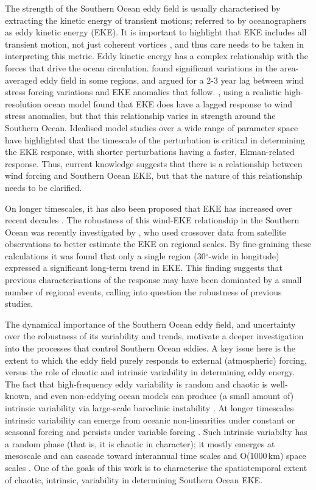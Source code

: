 \documentclass[linenumbers]{agujournal2019}
\begin{document}
The strength of the Southern Ocean eddy field is usually characterised by extracting the kinetic energy of transient motions; referred to by oceanographers as eddy kinetic energy (EKE). 
It is important to highlight that EKE includes all transient motion, not just coherent vortices \citep{Martinez-Moreno2019}, and thus care needs to be taken in interpreting this metric.
Eddy kinetic energy has a complex relationship with the forces that drive the ocean circulation.
\citet{Meredith-Hogg-2006} found significant variations in the area-averaged eddy field in some regions, and argued for a 2-3 year lag between wind stress forcing variations and EKE anomalies that follow.
\citet{Patara2016}, using a realistic high-resolution ocean model found that EKE does have a lagged response to wind stress anomalies, but that this relationship varies in strength around the Southern Ocean.
Idealised model studies over a wide range of parameter space \citep{Sinha2016} have highlighted that the timescale of the perturbation is critical in determining the EKE response, with shorter perturbations having a faster, Ekman-related response.
Thus, current knowledge suggests that there is a relationship between wind forcing and Southern Ocean EKE, but that the nature of this relationship needs to be clarified.

On longer timescales, it has also been proposed that EKE has increased over recent decades \citep{Hogg2015, Martinez-Moreno2019, Martinez-Moreno2021-ncc}.
The robustness of this wind-EKE relationship in the Southern Ocean was recently investigated by \citet{Zhang2021}, who used crossover data from satellite observations \citep[as in][]{Hogg2015} to better estimate the EKE on regional scales.
By fine-graining these calculations it was found that only a single region (30$^\circ$-wide in longitude) expressed a significant long-term trend in EKE.
This finding  suggests that previous characterisations of the response may have been dominated by a small number of regional events, calling into question the robustness of previous studies.

The dynamical importance of the Southern Ocean eddy field, and uncertainty over the robustness of its variability and trends, motivate a deeper investigation into the processes that control Southern Ocean eddies.
A key issue here is the extent to which the eddy field purely responds to external (atmospheric) forcing, versus the role of chaotic and intrinsic variability in determining eddy energy.
The fact that high-frequency eddy variability is random and chaotic is well-known, and even non-eddying ocean models can produce (a small amount of) intrinsic variability via large-scale baroclinic instability \citep[e.g.][]{DeVerdiere1999,Constantinou2021}.
At longer timescales intrinsic variability can emerge from oceanic non-linearities under constant or seasonal forcing and persists under variable forcing \citep{Leroux2018}.
Such intrinsic variabilty has a random phase (that is, it is chaotic in character); it mostly emerges at mesoscale and can cascade toward interannual time scales and O(1000$\,$km) space scales \citep{Serazin-etal-2018}.
One of the goals of this work is to characterise the spatiotemporal extent of chaotic, intrinsic, variability in determining  Southern Ocean EKE.
\end{document}
